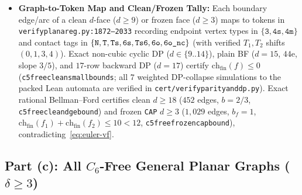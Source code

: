 \documentclass[11pt,reqno]{amsart}
\theoremstyle{plain}
\theoremstyle{definition}
\theoremstyle{remark}
\newcommand{\chf}{\mathrm{ch}_{\mathrm{fin}}}
\DeclareRobustCommand{\_}{\ifmmode\text{\textunderscore}\else\textunderscore\allowbreak\fi}
\begin{document}
\begin{itemize}[leftmargin=1.8em]
  \item \textbf{Graph-to-Token Map and Clean/Frozen Tally:} Each boundary edge/arc of a clean $d$-face ($d \ge 9$) or frozen face ($d \ge 3$) maps to tokens in \texttt{verify\_planar\_eg.py:1872--2033} recording endpoint vertex types in $\{\texttt{3}, \texttt{4s}, \texttt{4m}\}$ and contact tags in $\{\texttt{N}, \texttt{T}, \texttt{Ts}, \texttt{6s}, \texttt{Ts6}, \texttt{6o}, \texttt{6o\_nc}\}$ (with verified $T_1, T_2$ shifts $(0, 1, 3, 4)$). Exact non-cubic cyclic DP ($d \in \{9..14\}$), plain BF ($d = 15$, $44$e, slope $3/5$), and $17$-row backward DP ($d = 17$) certify $\chf(f) \le 0$ (\texttt{c5free\_clean\_small\_bounds}; all $7$ weighted DP-collapse simulations to the packed Lean automata are verified in \texttt{cert/verify\_parity\_and\_dp.py}). Exact rational Bellman--Ford certifies clean $d \ge 18$ ($452$ edges, $b = 2/3$, \texttt{c5free\_clean\_d\_ge\_18\_bound}) and frozen \texttt{CAP} $d \ge 3$ ($1{,}029$ edges, $b_f = 1$, $\chf(f_1) + \chf(f_2) \le 10 < 12$, \texttt{c5free\_frozen\_cap\_bound}), contradicting~\eqref{eq:euler-vf}.
\end{itemize}

\subsection{Part (c): All \texorpdfstring{$C_6$}{C6}-Free General Planar Graphs (\texorpdfstring{$\delta \ge 3$}{delta >= 3})}\label{subsec:c6free}
\end{document}
